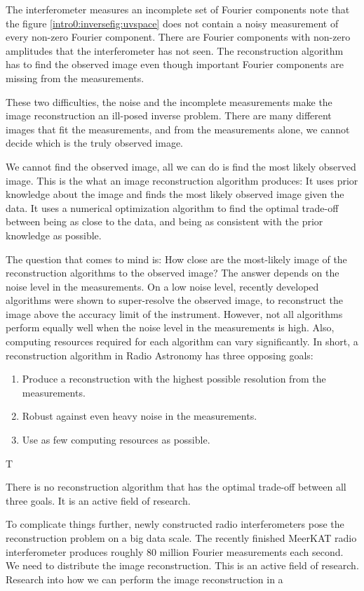 The interferometer measures an incomplete set of Fourier components note that the figure \ref{intro0:inversefig:uvspace} does not contain a noisy measurement of every non-zero Fourier component. There are Fourier components with non-zero amplitudes that the interferometer has not seen. The reconstruction algorithm has to find the observed image even though important Fourier components are missing from the measurements.

These two difficulties, the noise and the incomplete measurements make the image reconstruction an ill-posed inverse problem. There are many different images that fit the measurements, and from the measurements alone, we cannot decide which is the truly observed image. 

We cannot find the observed image, all we can do is find the most likely observed image. This is the what an image reconstruction algorithm produces: It uses prior knowledge about the image and finds the most likely observed image given the data. It uses a numerical optimization algorithm to find the optimal trade-off between being as close to the data, and being as consistent with the prior knowledge as possible.

The question that comes to mind is: How close are the most-likely image of the reconstruction algorithms to the observed image? The answer depends on the noise level in the measurements. On a low noise level, recently developed algorithms were shown to super-resolve the observed image\cite{dabbech2018cygnus, dabbech2015moresane}, to reconstruct the image above the accuracy limit of the instrument. However, not all algorithms perform equally well when the noise level in the measurements is high. Also, computing resources required for each algorithm can vary significantly. In short, a reconstruction algorithm in Radio Astronomy has three opposing goals:
\begin{enumerate}
	\item Produce a reconstruction with the highest possible resolution from the measurements.
	\item Robust against even heavy noise in the measurements.
	\item Use as few computing resources as possible.
\end{enumerate}

T

There is no reconstruction algorithm that has the optimal trade-off between all three goals. It is an active field of research.

To complicate things further, newly constructed radio interferometers pose the reconstruction problem on a big data scale. The recently finished MeerKAT radio interferometer produces roughly 80 million Fourier measurements each second.
We need to distribute the image reconstruction. This is an active field of research.
Research into how we can perform the image reconstruction in a

